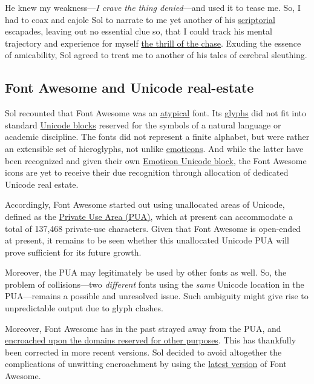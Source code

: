 \documentclass[
  british,
  a4paper,
  rgb,
  dvipsnames,
  svgnames,
  hyphens]{article}
\begin{document}
He knew my weakness---\emph{I crave the thing denied}---and used it to
tease me. So, I had to coax and cajole Sol to narrate to me yet another
of his \href{https://www.lexico.com/definition/scriptorial}{scriptorial}
escapades, leaving out no essential clue so, that I could track his
mental trajectory and experience for myself
\href{https://www.collinsdictionary.com/dictionary/english/the-thrill-of-the-chase}{the
thrill of the chase}. Exuding the essence of amicability, Sol agreed to
treat me to another of his tales of cerebral sleuthing.

\hypertarget{font-awesome-and-unicode-real-estate}{%
\subsection{Font Awesome and Unicode
real-estate}\label{font-awesome-and-unicode-real-estate}}

Sol recounted that Font Awesome was an
\href{https://www.merriam-webster.com/dictionary/atypical}{atypical}
font. Its \href{https://en.wikipedia.org/wiki/Glyph}{glyphs} did not fit
into standard \href{https://en.wikipedia.org/wiki/Unicode_block}{Unicode
blocks} reserved for the symbols of a natural language or academic
discipline. The fonts did not represent a finite alphabet, but were
rather an extensible set of hieroglyphs, not unlike
\href{https://en.wikipedia.org/wiki/Emoticon}{emoticons}. And while the
latter have been recognized and given their own
\href{https://en.wikipedia.org/wiki/Emoticons_(Unicode_block)}{Emoticon
Unicode block}, the Font Awesome icons are yet to receive their due
recognition through allocation of dedicated Unicode real estate.

Accordingly, Font Awesome started out using unallocated areas of
Unicode, defined as the
\href{https://www.unicode.org/faq/private_use.html}{Private Use Area
(PUA)}, which at present can accommodate a total of 137,468 private-use
characters. Given that Font Awesome is open-ended at present, it remains
to be seen whether this unallocated Unicode PUA will prove sufficient
for its future growth.

Moreover, the PUA may legitimately be used by other fonts as well. So,
the problem of collisions---two \emph{different} fonts using the
\emph{same} Unicode location in the PUA---remains a possible and
unresolved issue. Such ambiguity might give rise to unpredictable output
due to glyph clashes.

Moreover, Font Awesome has in the past strayed away from the PUA, and
\href{https://fontawesome.com/v5.15/how-to-use/on-the-web/advanced/css-pseudo-elements}{encroached
upon the domains reserved for other purposes}. This has thankfully been
corrected in more recent versions. Sol decided to avoid altogether the
complications of unwitting encroachment by using the
\href{https://fontawesome.com/download\#}{latest version} of Font
Awesome.
\end{document}
